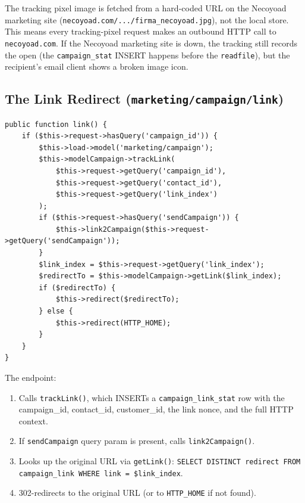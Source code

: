 \documentclass[11pt,a4paper]{article}
\begin{document}
\begin{findingbox}
The tracking pixel image is fetched from a hard-coded URL on the
Necoyoad marketing site
(\texttt{necoyoad.com/.../firma\_necoyoad.jpg}), not the local
store. This means every tracking-pixel request makes an outbound
HTTP call to \texttt{necoyoad.com}. If the Necoyoad marketing site
is down, the tracking still records the open (the
\texttt{campaign\_stat} INSERT happens before the
\texttt{readfile}), but the recipient's email client shows a
broken image icon.
\end{findingbox}

\subsection{The Link Redirect (\texttt{marketing/campaign/link})}

\begin{lstlisting}[caption={\texttt{ControllerMarketingCampaign::link()} --- the click-tracking redirect.},label={lst:link}]
public function link() {
    if ($this->request->hasQuery('campaign_id')) {
        $this->load->model('marketing/campaign');
        $this->modelCampaign->trackLink(
            $this->request->getQuery('campaign_id'),
            $this->request->getQuery('contact_id'),
            $this->request->getQuery('link_index')
        );
        if ($this->request->hasQuery('sendCampaign')) {
            $this->link2Campaign($this->request->getQuery('sendCampaign'));
        }
        $link_index = $this->request->getQuery('link_index');
        $redirectTo = $this->modelCampaign->getLink($link_index);
        if ($redirectTo) {
            $this->redirect($redirectTo);
        } else {
            $this->redirect(HTTP_HOME);
        }
    }
}
\end{lstlisting}

The endpoint:

\begin{enumerate}[leftmargin=1.6em,itemsep=2pt]
  \item Calls \texttt{trackLink()}, which INSERTs a
        \texttt{campaign\_link\_stat} row with the campaign\_id,
        contact\_id, customer\_id, the link nonce, and the full
        HTTP context.
  \item If \texttt{sendCampaign} query param is present, calls
        \texttt{link2Campaign()}.
  \item Looks up the original URL via \texttt{getLink()}:
        \texttt{SELECT DISTINCT redirect FROM campaign\_link WHERE
        link = \$link\_index}.
  \item 302-redirects to the original URL (or to \texttt{HTTP\_HOME}
        if not found).
\end{enumerate}
\end{document}

